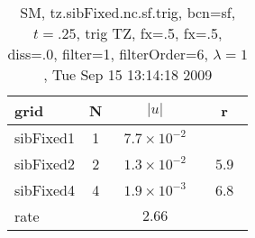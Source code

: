 \begin{table}[hbt]\tableFont %
\begin{center}
\begin{tabular}{|l|c|c|c|} \hline 
grid  & N &  $\vert u \vert$   & r \\ \hline 
           sibFixed1 &     1 & ~$7.7\times10^{ -2}$~ &            \\ \hline
           sibFixed2 &     2 & ~$1.3\times10^{ -2}$~ & ~$  5.9$~  \\ \hline
           sibFixed4 &     4 & ~$1.9\times10^{ -3}$~ & ~$  6.8$~  \\ \hline
    rate             &       &       $2.66$         &        \\ \hline
\end{tabular}
\caption{SM, tz.sibFixed.nc.sf.trig, bcn=sf, $t=.25$, trig TZ, fx=.5, fx=.5, diss=.0, filter=1, filterOrder=6, $\lambda=1$, Tue Sep 15 13:14:18 2009}\label{table:tz.sibFixed.nc.sf.trig}
\end{center}
\end{table}
